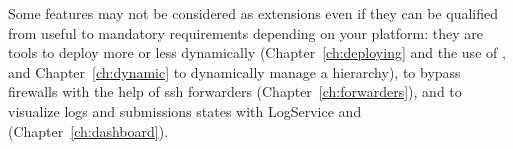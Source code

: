 Some features may not be considered as extensions even if they can be
qualified from useful to mandatory requirements depending on your
platform: they are tools to deploy \diet more or less dynamically
(Chapter~\ref{ch:deploying} and the use of \godiet, and
Chapter~\ref{ch:dynamic} to dynamically manage a hierarchy), to bypass
firewalls with the help of ssh forwarders
(Chapter~\ref{ch:forwarders}), and to visualize logs and submissions
states with LogService and \vizdiet (Chapter~\ref{ch:dashboard}).



